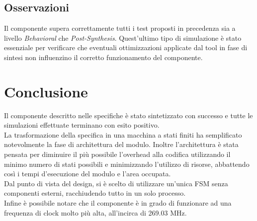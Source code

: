 \documentclass{article}
\begin{document}
\subsection{Osservazioni}
Il componente supera correttamente tutti i test proposti in precedenza sia a livello \textit{Behavioral} che \textit{Post-Synthesis}. Quest’ultimo tipo di simulazione è stato essenziale per verificare che eventuali ottimizzazioni applicate dal tool in fase di sintesi non influenzino il corretto funzionamento del componente.






\newpage
\section{Conclusione}
Il componente descritto nelle specifiche è stato sintetizzato con successo e tutte le simulazioni effettuate terminano con esito positivo.\\
La trasformazione della specifica in una macchina a stati finiti ha semplificato notevolmente la fase di architettura del modulo. Inoltre l'architettura è stata pensata per diminuire il più possibile l'overhead alla codifica utilizzando il minimo numero di stati possibili e minimizzando l'utilizzo di risorse, abbattendo così i tempi d’esecuzione del modulo e l'area occupata.\\
Dal punto di vista del design, si è scelto di utilizzare un'unica FSM senza componenti esterni, racchiudendo tutto in un solo processo.\\
Infine è possibile notare che il componente è in grado di funzionare ad una frequenza di clock molto più alta, all'incirca di 269.03 MHz.
\end{document}
